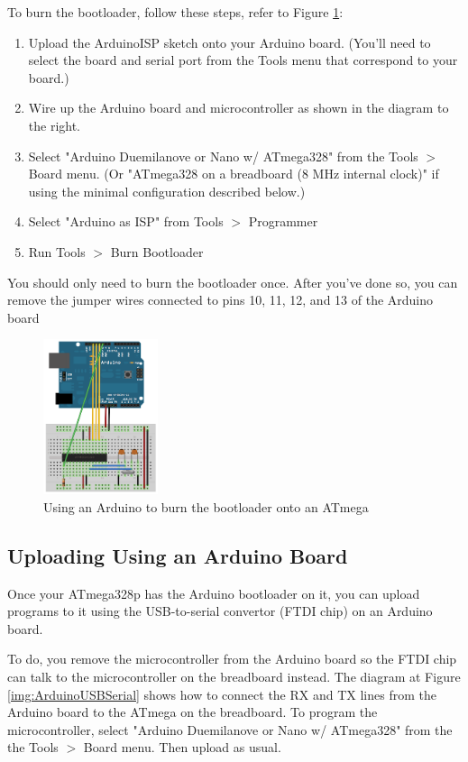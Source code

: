 \documentclass{article}
\begin{document}
To burn the bootloader, follow these steps, refer to Figure \ref{img:breadBoardAVR}:
\begin{enumerate}
    \item Upload the ArduinoISP sketch onto your Arduino board. (You'll need to select the board and serial port from the Tools menu that correspond to your board.)
    \item Wire up the Arduino board and microcontroller as shown in the diagram to the right.
    \item Select "Arduino Duemilanove or Nano w/ ATmega328" from the Tools $>$ Board menu. (Or "ATmega328 on a breadboard (8 MHz internal clock)" if using the minimal configuration described below.)
    \item Select "Arduino as ISP" from Tools $>$ Programmer
    \item Run Tools $>$ Burn Bootloader
\end{enumerate}

You should only need to burn the bootloader once. After you've done so, you can remove the jumper wires connected to pins 10, 11, 12, and 13 of the Arduino board

\begin{figure}[!h]
    \center
    \includegraphics[width=0.3\textwidth,keepaspectratio]{BreadboardAVR}
    \caption{Using an Arduino to burn the bootloader onto an ATmega}
    \label{img:breadBoardAVR}
\end{figure}


\subsection{Uploading Using an Arduino Board}
Once your ATmega328p has the Arduino bootloader on it, you can upload programs to it using the USB-to-serial convertor (FTDI chip) on an Arduino board. \par To do, you remove the microcontroller from the Arduino board so the FTDI chip can talk to the microcontroller on the breadboard instead. The diagram at Figure \ref{img:ArduinoUSBSerial} shows how to connect the RX and TX lines from the Arduino board to the ATmega on the breadboard. To program the microcontroller, select "Arduino Duemilanove or Nano w/ ATmega328" from the the Tools $>$ Board menu. Then upload as usual.
\end{document}
